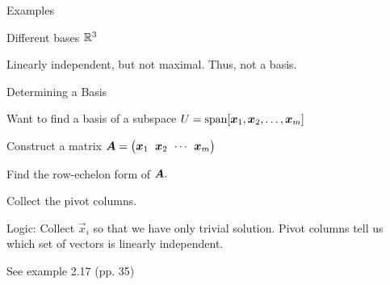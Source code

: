 \documentclass[fleqn,aspectratio=169]{beamer}
\begin{document}
\begin{frame}{Examples}

\plitemsep 0.1in

\bci 
\item Different bases ${\mathbb R}^3$
\item Linearly independent, but not maximal. Thus, not a basis. 

\eci

\end{frame}


\begin{frame}{Determining a Basis}

\plitemsep 0.1in

\bci 
\item Want to find a basis of a subspace $U = \text{span}[\bm{x}_1, \bm{x}_2, \ldots, \bm{x}_m]$

\bce
\item Construct a matrix $\mat{A} = \rowvec{\vec{x}_1 & \vec{x}_2 & \cdots & \vec{x}_m}$
\item Find the row-echelon form of $\bm{A}.$
\item Collect the pivot columns.
\ece

\item Logic: Collect $\vec{x}_i$ so that we have only trivial solution. Pivot columns tell us which set of vectors is linearly independent. 

\item See example 2.17 (pp. 35)
\eci

\end{frame}
\end{document}
